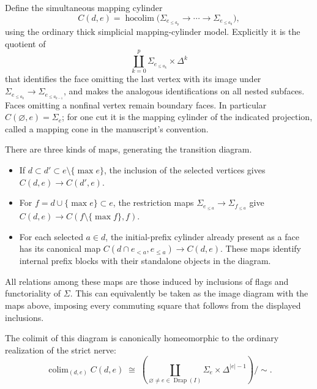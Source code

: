 Define the simultaneous mapping cylinder \[
 C(d,e)=\operatorname{hocolim}\bigl(
 \Sigma_{e_{\le a_p}}\longrightarrow\cdots\longrightarrow
 \Sigma_{e_{\le a_0}}\bigr),
\] using the ordinary thick simplicial mapping-cylinder model. Explicitly it is the quotient of \[
 \coprod_{k=0}^{p}\Sigma_{e_{\le a_k}}\times\Delta^k
\] that identifies the face omitting the last vertex with its image under \(\Sigma_{e_{\le a_k}}\to\Sigma_{e_{\le a_{k-1}}}\), and makes the analogous identifications on all nested subfaces. Faces omitting a nonfinal vertex remain boundary faces. In particular \(C(\varnothing,e)=\Sigma_e\); for one cut it is the mapping cylinder of the indicated projection, called a mapping cone in the manuscript's convention.

There are three kinds of maps, generating the transition diagram.

\begin{itemize}
\tightlist
\item
  If \(d\subset d'\subset e\setminus\{\max e\}\), the inclusion of the selected vertices gives \(C(d,e)\to C(d',e)\).
\item
  For \(f=d\cup\{\max e\}\subset e\), the restriction maps \(\Sigma_{e_{\le a}}\to\Sigma_{f_{\le a}}\) give \(C(d,e)\to C(f\setminus\{\max f\},f)\).
\item
  For each selected \(a\in d\), the initial-prefix cylinder already present as a face has its canonical map \(C(d\cap e_{<a},e_{\le a})\to C(d,e)\). These maps identify internal prefix blocks with their standalone objects in the diagram.
\end{itemize}

All relations among these maps are those induced by inclusions of flags and functoriality of \(\Sigma\). This can equivalently be taken as the image diagram with the maps above, imposing every commuting square that follows from the displayed inclusions.

The colimit of this diagram is canonically homeomorphic to the ordinary realization of the strict nerve: \[
 \operatorname{colim}_{(d,e)}C(d,e)
 \;\cong\;
 \left(\coprod_{\varnothing\ne e\in\operatorname{Drap}(I)}
 \Sigma_e\times\Delta^{|e|-1}\right)/\sim .
\]


